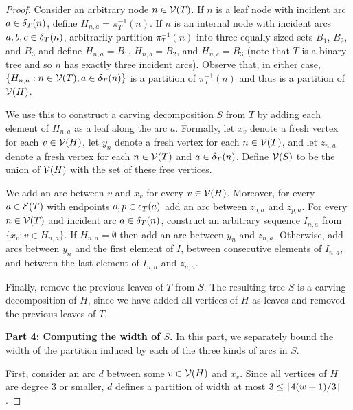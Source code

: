\begin{proof}
Consider an arbitrary node $n \in \mathcal{V}(T)$. If $n$ is a leaf node with incident arc $a \in \delta_{T}(n)$, define $H_{n,a} = \pi_T^{-1}(n)$. If $n$ is an internal node with incident arcs $a,b,c \in \delta_{T}(n)$, arbitrarily partition $\pi_T^{-1}(n)$ into three equally-sized sets $B_1$, $B_2$, and $B_3$ and define $H_{n,a} = B_1$, $H_{n,b} = B_2$, and $H_{n,c} = B_3$ (note that $T$ is a binary tree and so $n$ has exactly three incident arcs). Observe that, in either case, $\{H_{n,a} : n \in \mathcal{V}(T), a \in \delta_{T}(n)\}$ is a partition of $\pi_T^{-1}(n)$ and thus is a partition of $\mathcal{V}(H)$. 

We use this to construct a carving decomposition $S$ from $T$ by adding each element of $H_{n,a}$ as a leaf along the arc $a$. Formally, let $x_v$ denote a fresh vertex for each $v \in \mathcal{V}(H)$, let $y_n$ denote a fresh vertex for each $n \in \mathcal{V}(T)$, and let $z_{n,a}$ denote a fresh vertex for each $n \in \mathcal{V}(T)$ and $a \in \delta_{T}(n)$. Define $\mathcal{V}(S)$ to be the union of $\mathcal{V}(H)$ with the set of these free vertices. 

We add an arc between $v$ and $x_v$ for every $v \in \mathcal{V}(H)$. Moreover, for every $a \in \mathcal{E}(T)$ with endpoints $o, p \in \epsilon_{T}(a)$ add an arc between $z_{o,a}$ and $z_{p,a}$. For every $n \in \mathcal{V}(T)$ and incident arc $a \in \delta_{T}(n)$, construct an arbitrary sequence $I_{n,a}$ from $\{x_v : v \in H_{n,a}\}$. If $H_{n,a} = \emptyset$ then add an arc between $y_n$ and $z_{n,a}$. Otherwise, add arcs between $y_n$ and the first element of $I$, between consecutive elements of $I_{n,a}$, and between the last element of $I_{n,a}$ and $z_{n,a}$. 

Finally, remove the previous leaves of $T$ from $S$. The resulting tree $S$ is a carving decomposition of $H$, since we have added all vertices of $H$ as leaves and removed the previous leaves of $T$.

\textbf{Part 4: Computing the width of $S$.} In this part, we separately bound the width of the partition induced by each of the three kinds of arcs in $S$.

First, consider an arc $d$ between some $v \in \mathcal{V}(H)$ and $x_v$. Since all vertices of $H$ are degree 3 or smaller, $d$ defines a partition of width at most $3 \leq \lceil4(w+1)/3\rceil$.


\end{proof}
